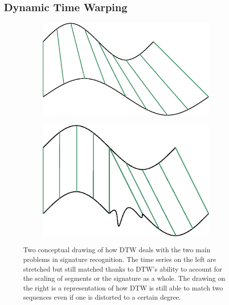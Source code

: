 \documentclass[a4paper, oneside]{csthesis}
\begin{document}
\subsection{Dynamic Time Warping}


\begin{figure}
        \centering
        \begin{subfigure}[b]{0.30\textwidth}
                \centering
                \includegraphics[width=\textwidth]{figures/dtw-stretch.eps}
                \label{fig:hmm1}
        \end{subfigure}%
        \quad
        \begin{subfigure}[b]{0.30\textwidth}
                \centering
                \includegraphics[width=\textwidth]{figures/dtw-distort.eps}
                \label{fig:hmm1}
        \end{subfigure}%

        \caption{Two conceptual drawing of how DTW deals with the two main problems in signature recognition. The time series on the left are stretched but still matched thanks to DTW's ability to account for the scaling of segments or the signature as a whole. The drawing on the right is a representation of how DTW is still able to match two sequences even if one is distorted to a certain degree.}
        \label{fig:dtw-model}
\end{figure}
\end{document}

